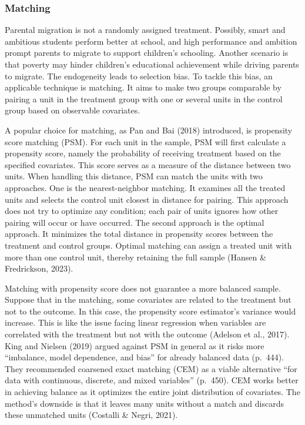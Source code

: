 \documentclass[
  man]{apa7}
\begin{document}
\hypertarget{matching}{%
\subsubsection{Matching}\label{matching}}

Parental migration is not a randomly assigned treatment. Possibly, smart and ambitious students perform better at school, and high performance and ambition prompt parents to migrate to support children's schooling. Another scenario is that poverty may hinder children's educational achievement while driving parents to migrate. The endogeneity leads to selection bias. To tackle this bias, an applicable technique is matching. It aims to make two groups comparable by pairing a unit in the treatment group with one or several units in the control group based on observable covariates.

A popular choice for matching, as Pan and Bai (2018) introduced, is propensity score matching (PSM). For each unit in the sample, PSM will first calculate a propensity score, namely the probability of receiving treatment based on the specified covariates. This score serves as a measure of the distance between two units. When handling this distance, PSM can match the units with two approaches. One is the nearest-neighbor matching. It examines all the treated units and selects the control unit closest in distance for pairing. This approach does not try to optimize any condition; each pair of units ignores how other pairing will occur or have occurred. The second approach is the optimal approach. It minimizes the total distance in propensity scores between the treatment and control groups. Optimal matching can assign a treated unit with more than one control unit, thereby retaining the full sample (Hansen \& Fredrickson, 2023).

Matching with propensity score does not guarantee a more balanced sample. Suppose that in the matching, some covariates are related to the treatment but not to the outcome. In this case, the propensity score estimator's variance would increase. This is like the issue facing linear regression when variables are correlated with the treatment but not with the outcome (Adelson et al., 2017). King and Nielsen (2019) argued against PSM in general as it risks more ``imbalance, model dependence, and bias'' for already balanced data (p.~444). They recommended coarsened exact matching (CEM) as a viable alternative ``for data with continuous, discrete, and mixed variables'' (p.~450). CEM works better in achieving balance as it optimizes the entire joint distribution of covariates. The method's downside is that it leaves many units without a match and discards these unmatched units (Costalli \& Negri, 2021).
\end{document}
